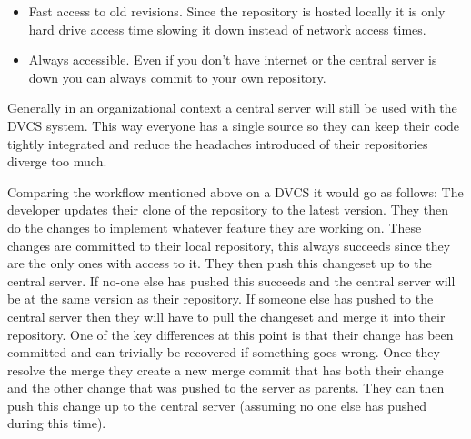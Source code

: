     \begin{itemize}
      \item Fast access to old revisions.  Since the repository is hosted
      locally it is only hard drive access time slowing it down instead of
      network access times.
      \item Always accessible.  Even if you don't have internet or the central
      server is down you can always commit to your own repository.
    \end{itemize}

    Generally in an organizational context a central server will still be used
    with the DVCS system.  This way everyone has a single source so they can
    keep their code tightly integrated and reduce the headaches introduced of
    their repositories diverge too much.

    Comparing the workflow mentioned above on a DVCS it would go as follows:
    The developer updates their clone of the repository to the latest version.
    They then do the changes to implement whatever feature they are working on.
    These changes are committed to their local repository, this always succeeds
    since they are the only ones with access to it.  They then push this
    changeset up to the central server.  If no-one else has pushed this succeeds
    and the central server will be at the same version as their repository.  If
    someone else has pushed to the central server then they will have to pull
    the changeset and merge it into their repository.  One of the key
    differences at this point is that their change has been committed and can
    trivially be recovered if something goes wrong.  Once they resolve the merge
    they create a new merge commit that has both their change and the other
    change that was pushed to the server as parents.  They can then push this
    change up to the central server (assuming no one else has pushed during this
    time).
